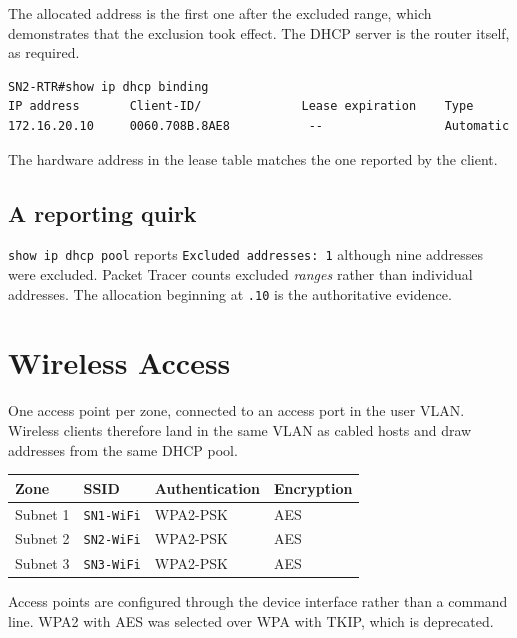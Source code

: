 \documentclass[12pt,a4paper]{article}
\begin{document}
The allocated address is the first one after the excluded range, which
demonstrates that the exclusion took effect. The DHCP server is the router
itself, as required.

\begin{lstlisting}
SN2-RTR#show ip dhcp binding
IP address       Client-ID/              Lease expiration    Type
172.16.20.10     0060.708B.8AE8           --                 Automatic
\end{lstlisting}

The hardware address in the lease table matches the one reported by the client.

\subsection{A reporting quirk}

\texttt{show ip dhcp pool} reports \texttt{Excluded addresses: 1} although nine
addresses were excluded. Packet Tracer counts excluded \emph{ranges} rather than
individual addresses. The allocation beginning at \texttt{.10} is the
authoritative evidence.

\newpage
\section{Wireless Access}

One access point per zone, connected to an access port in the user VLAN. Wireless
clients therefore land in the same VLAN as cabled hosts and draw addresses from
the same DHCP pool.

\begin{table}[H]
\centering
\begin{tabular}{@{} l l l l @{}}
\toprule
\textbf{Zone} & \textbf{SSID} & \textbf{Authentication} & \textbf{Encryption} \\
\midrule
Subnet 1 & \texttt{SN1-WiFi} & WPA2-PSK & AES \\
Subnet 2 & \texttt{SN2-WiFi} & WPA2-PSK & AES \\
Subnet 3 & \texttt{SN3-WiFi} & WPA2-PSK & AES \\
\bottomrule
\end{tabular}
\end{table}

Access points are configured through the device interface rather than a command
line. WPA2 with AES was selected over WPA with TKIP, which is deprecated.
\end{document}
